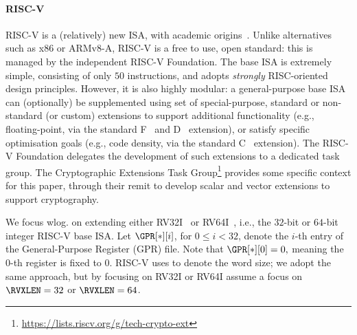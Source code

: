 
\paragraph{RISC-V}
\label{sec:bg:riscv}

RISC-V is a (relatively) new ISA, with academic origins~\cite{riscv:1,riscv:2}.
Unlike alternatives such as x86 or ARMv8-A, RISC-V is a free to use, 
open standard: this is managed by the independent RISC-V Foundation.
The base ISA is extremely simple, consisting of only $50$ instructions,
and adopts {\em strongly} RISC-oriented design principles.  However, it
is also highly modular: a general-purpose base ISA can (optionally) be
supplemented using set of special-purpose, standard or non-standard (or
custom) extensions to
support additional functionality 
(e.g., floating-point, 
       via the 
       standard F~\cite[Section 11]{RV:ISA:I:19}
                and
                D~\cite[Section 12]{RV:ISA:I:19}
       extension),
or 
satisfy specific optimisation goals
(e.g., code density, 
       via the 
       standard C~\cite[Section 16]{RV:ISA:I:19}
       extension).
The RISC-V Foundation delegates the development of such extensions to a
dedicated task group.  The Cryptographic Extensions Task Group\footnote{
  \url{https://lists.riscv.org/g/tech-crypto-ext}
} provides some specific context for this paper, through their remit to 
develop scalar and vector extensions to support cryptography.

We focus wlog. on extending either
RV32I~\cite[Section 2]{RV:ISA:I:19}
or
RV64I~\cite[Section 5]{RV:ISA:I:19},
i.e., the
$32$-bit 
or
$64$-bit 
integer RISC-V base ISA.
Let $\GPR[*][ i ]$, for $0 \leq i < 32$, denote the $i$-th entry of the 
General-Purpose Register (GPR) file.  Note that 
$
\GPR[*][ 0 ] = 0 ,
$
meaning the $0$-th register is fixed to $0$.
RISC-V uses \RVXLEN to denote the word size; we adopt the same approach, 
but by focusing on 
RV32I 
or
RV64I 
assume a focus on 
$\RVXLEN = 32$
or
$\RVXLEN = 64$.

